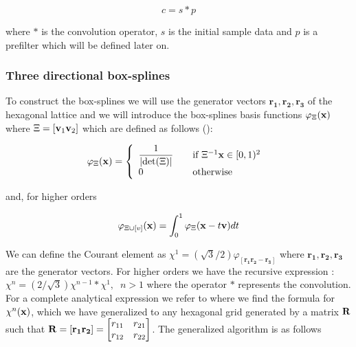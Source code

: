 \documentclass[11pt,a4paper]{amsart}
\begin{document}
\begin{equation}
\label{eqn:coefs}
 c = s * p
\end{equation}

where $*$ is the convolution operator, $s$ is the initial sample data and $p$ is a prefilter which will be defined later on.



\subsubsection{Three directional box-splines}

To construct the box-splines we will use the generator vectors $\mathbf{r_1, r_2, r_3}$ of the hexagonal lattice and we will introduce the box-splines basis functions $\varphi_{\Xi}(\mathbf{x})$ where $\Xi = [\mathbf{v}_1 \mathbf{v}_2]$ which are defined as follows (\cite{Condat2006, Boor1993}):

\begin{equation}
\varphi_{\Xi} (\mathbf{x}) = \left\{
  \begin{array}{l l}
    \dfrac{1}{\lvert \det(\Xi)\rvert} & \quad \text{if $\Xi^{-1}\mathbf{x} \in [0,1)^2$ }\\
    0 & \quad \text{otherwise}
  \end{array} \right.
\end{equation}

and, for higher orders

\begin{equation} \label{eqn:boxsplines_basis}
\varphi_{\Xi \cup [v]}(\mathbf{x}) = \int_0^ 1 \varphi_\Xi(\mathbf{x}-t\mathbf{v})dt
\end{equation}
  
  
We can define the Courant element \cite{Boor1993} as $\chi^1 = (\sqrt{3}/2)\varphi_{[\mathbf{r_1 r_2 -r_3}]}$ where $\mathbf{r_1, r_2, r_3}$ are the generator vectors. For higher orders we have the recursive expression : $\chi^n = (2/\sqrt{3})\chi^ {n-1} * \chi^ 1, \;\; n>1$ where the operator $*$ represents the convolution. For a complete analytical expression we refer to \cite{Condat2006} where we find the formula for $\chi^n(\mathbf{x})$, which we have generalized to any hexagonal grid generated by a matrix $\mathbf{R}$ such that $\mathbf{R} = [\mathbf{r_1 r_2}] = \left[\begin{matrix}
r_{11}\\ 
r_{12}
\end{matrix}
\quad
\begin{matrix}
r_{21}\\  
r_{22}
\end{matrix}
\right]$. The generalized algorithm is as follows
\end{document}
